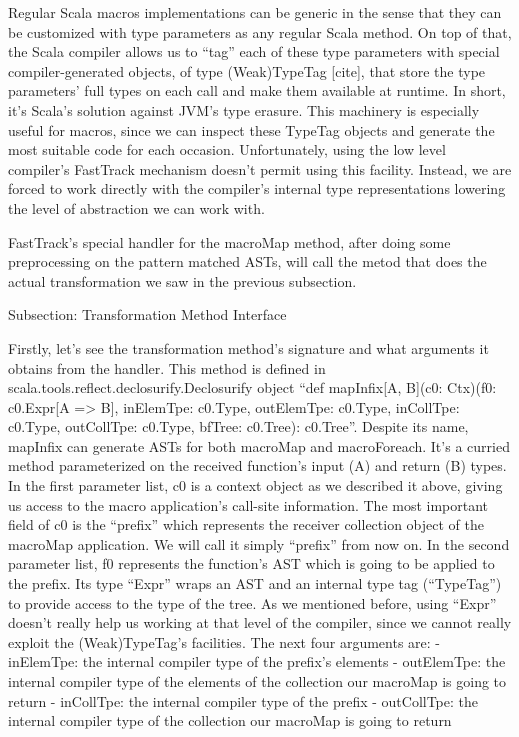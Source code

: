 Regular Scala macros implementations can be generic in the sense that they can
be customized with type parameters as any regular Scala method. On top of that,
the Scala compiler allows us to ``tag'' each of these type parameters with
special compiler-generated objects, of type (Weak)TypeTag [cite], that store the
type parameters' full types on each call and make them available at runtime. In
short, it's Scala's solution against JVM's type erasure. This machinery is
especially useful for macros, since we can inspect these TypeTag objects and
generate the most suitable code for each occasion. Unfortunately, using the low
level compiler's FastTrack mechanism doesn't permit using this facility.
Instead, we are forced to work directly with the compiler's internal type
representations lowering the level of abstraction we can work with.

FastTrack's special handler for the macroMap method, after
doing some preprocessing on the pattern matched ASTs, will call the metod
that does the actual transformation we saw in the previous subsection. 


Subsection: Transformation Method Interface

Firstly, let's see the transformation method's signature and what arguments it
obtains from the handler. This method is defined in
scala.tools.reflect.declosurify.Declosurify object ``def mapInfix[A, B](c0:
Ctx)(f0: c0.Expr[A => B], inElemTpe: c0.Type, outElemTpe: c0.Type, inCollTpe:
c0.Type, outCollTpe: c0.Type, bfTree: c0.Tree): c0.Tree''. Despite its name,
mapInfix can generate ASTs for both macroMap and macroForeach. It's a curried
method parameterized on the received function's input (A) and return (B) types.
In the first parameter list, c0 is a context object as we described it above,
giving us access to the macro application's call-site information. The most
important field of c0 is the ``prefix'' which represents the receiver collection
object of the macroMap application. We will call it simply ``prefix''
from now on. In the second parameter
list, f0 represents the function's AST which is going to be applied to the
prefix. Its type ``Expr'' wraps an AST and an internal type tag
(``TypeTag'') to provide access to the type of the tree. As we mentioned
before, using ``Expr'' doesn't really help us working at that level of the
compiler, since we cannot really exploit the (Weak)TypeTag's facilities. The
next four arguments are:
 - inElemTpe: the internal compiler type of the prefix's elements
 - outElemTpe: the internal compiler type of the elements of the collection our
macroMap
is going to return
- inCollTpe: the internal compiler type of the prefix
- outCollTpe: the internal compiler type of the collection our macroMap is going
to return

